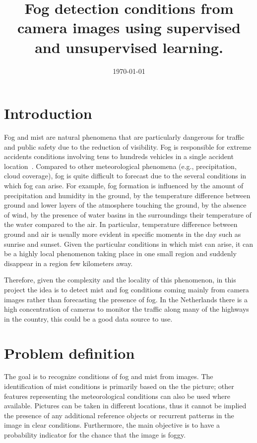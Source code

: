 \documentclass[conference]{IEEEtran}
\date{\today}
\author{
	\IEEEauthorblockN{Andrea Pagani}
	\IEEEauthorblockA{De Bilt, Netherlands\\ Email: andrea.pagani@knmi.nl}}
\title{
	Fog detection conditions from camera images using supervised and unsupervised learning.
}
\begin{document}
\maketitle

\section{Introduction}
Fog and mist are natural phenomena that are particularly dangerous for traffic and public safety due to the reduction of visibility. Fog is responsible for extreme accidents conditions involving tens to hundreds vehicles in a single accident location~\cite{hamilton2014hidden}. Compared to other meteorological phenomena (e.g., precipitation, cloud coverage), 
fog is quite difficult to forecast due to the several conditions in which fog can arise. For example, fog 
formation is influenced by the amount of precipitation and humidity in the ground, by the temperature 
difference between ground and  lower layers of the atmosphere touching the ground, by the absence of wind, by the 
presence of water basins in the surroundings their temperature of the water compared to the air. In particular, 
temperature difference between ground and air is usually more evident in specific moments in the day such as sunrise and sunset.
Given the particular conditions in which mist can arise, it can be a highly local phenomenon taking 
place in one small region and suddenly disappear in a region few kilometers away.

Therefore, given the complexity and the locality of this phenomenon, in this project the idea is to detect mist and fog conditions coming mainly from camera images rather than forecasting the 
presence of fog. In the Netherlands there is a high concentration of cameras to monitor the traffic along 
many of the highways in the country, this could be a good data source to use.

\section{Problem definition}
The goal is to recognize conditions of fog and mist from images. The identification of mist conditions 
is primarily based on the the picture; other features representing the meteorological conditions can also be used where available. Pictures can be taken in different locations, thus it cannot be 
implied the presence of any additional reference objects or recurrent patterns in the image in clear conditions. 
Furthermore, the main objective is to have a probability indicator for the chance that the image is foggy. 
\end{document}

